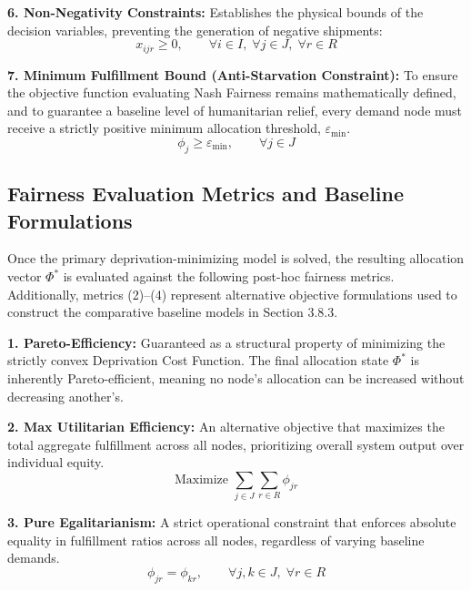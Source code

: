 \textbf{6. Non-Negativity Constraints:} Establishes the physical bounds of the decision variables, preventing the generation of negative shipments:
\begin{equation}
    x_{ijr} \ge 0, \qquad \forall i \in I, \; \forall j \in J, \; \forall r \in R
    \label{eq:non_negativity}
\end{equation}

\textbf{7. Minimum Fulfillment Bound (Anti-Starvation Constraint):} To ensure the objective function evaluating Nash Fairness remains mathematically defined, and to guarantee a baseline level of humanitarian relief, every demand node must receive a strictly positive minimum allocation threshold, $\varepsilon_{\min}$.
\begin{equation}
    \phi_j \ge \varepsilon_{\min}, \qquad \forall j \in J
    \label{eq:nash_anti_starvation}
\end{equation}

\subsection{Fairness Evaluation Metrics and Baseline Formulations}
Once the primary deprivation-minimizing model is solved, the resulting allocation vector $\Phi^*$ is evaluated against the following post-hoc fairness metrics. Additionally, metrics (2)–(4) represent alternative objective formulations used to construct the comparative baseline models in Section 3.8.3.

\textbf{1. Pareto-Efficiency:} Guaranteed as a structural property of minimizing the strictly convex Deprivation Cost Function. The final allocation state $\Phi^*$ is inherently Pareto-efficient, meaning no node's allocation can be increased without decreasing another's.

\textbf{2. Max Utilitarian Efficiency:} An alternative objective that maximizes the total aggregate fulfillment across all nodes, prioritizing overall system output over individual equity.
\begin{equation}
    \text{Maximize } \sum_{j \in J} \sum_{r \in R} \phi_{jr}
    \label{eq:max_utilitarian}
\end{equation}

\textbf{3. Pure Egalitarianism:} A strict operational constraint that enforces absolute equality in fulfillment ratios across all nodes, regardless of varying baseline demands.
\begin{equation}
    \phi_{jr} = \phi_{kr}, \qquad \forall j, k \in J, \; \forall r \in R
    \label{eq:pure_egalitarian}
\end{equation}

